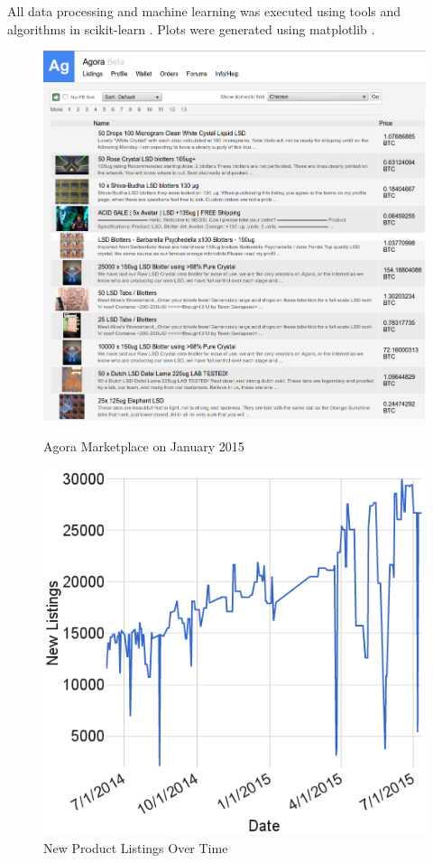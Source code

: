 All data processing and machine learning was executed using tools and algorithms
in scikit-learn \cite{scikit-learn}. Plots were generated using matplotlib
\cite{matplotlib}.
\begin{figure}[htbp]
    \begin{minipage}[t]{0.45\linewidth}
        \includegraphics[width=\linewidth]{agora}
        \caption{Agora Marketplace on January 2015}
        \label{agora}
    \end{minipage}
    \hfill
    \begin{minipage}[t]{0.45\linewidth}
        \includegraphics[width=\linewidth]{plots/new_listings_graph}
        \caption{New Product Listings Over Time}
        \label{product_time}
    \end{minipage}
\end{figure}
